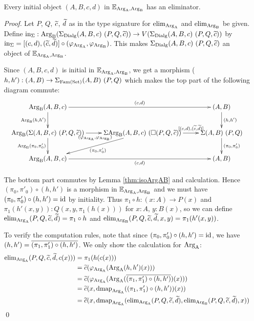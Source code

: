 \documentclass[orivec,envcountsame, ,envcountsect]{llncs}
\begin{document}
\begin{proposition}
\label{thm:init-to-elim}
Every initial object $(A, B, c, d)$ in $\mathbb{E}_{\text{Arg}_{\text{A}}, \text{Arg}_{\text{B}}}$ has an eliminator.
\end{proposition}
\begin{proof}
  Let $P$, $Q$, $\widetilde{c}$, $\widetilde{d}$ as in the type signature for $\text{elim}_{\text{Arg}_{\text{A}}}$
  and $\text{elim}_{\text{Arg}_{\text{B}}}$ be given. Define $\text{in}_{\Sigma} :
  \text{Arg}_{\text{B}}(\Sigma_{\text{Dialg}} (A, B, c)\ (P, Q, \widetilde{c})) \to V(\Sigma_{\text{Dialg}}
  (A, B, c)\ (P, Q, \widetilde{c}))$ by $\text{in}_{\Sigma} = [(c, d), (\widetilde{c},
    \widetilde{d})] \circ (\varphi_{\text{Arg}_{\text{A}}}, \varphi_{\text{Arg}_{\text{B}}})$. This makes
  $\Sigma_{\text{Dialg}} (A, B, c)\ (P, Q, \widetilde{c})$ an object of
  $\mathbb{E}_{\text{Arg}_{\text{A}}, \text{Arg}_{\text{B}}}$.

  Since $(A, B, c, d)$ is initial in $\mathbb{E}_{\text{Arg}_{\text{A}}, \text{Arg}_{\text{B}}}$, we get a morphism ($h, h') :
  (A, B) \to \Sigma_{\text{Fam}(\text{Set})} (A, B)\ (P, Q)$ which makes the top part of the
  following diagram commute:
\[
\resizebox{1\textwidth}{!}{%
\xymatrix{
\ArgB(A, B, c) \ar^-{(c, d)}[rr] \ar_-{\ArgB(h, h')}[d] & & (A, B) \ar^-{(h, h')}[d] \\
\ArgB(\Sigma (A, B, c)\ (P, Q, \stepind{c})) \ar_{(\varphi_{\ArgA}, \varphi_{\ArgB})}[r] \ar_-{\ArgB(\pi_0, \pi'_0)}[d]
 & \Sigma \ArgB(A, B, c)\ (\BOX(P, Q, \stepind{c}))  \ar^-{\sigmamorph{(c,d)}{(\stepind{c},\stepind{d})}}[r] \ar^{(\pi_0, \pi'_0)}[dl]
 & \Sigma (A, B)\ (P, Q) \ar^-{(\pi_0, \pi'_0)}[d]\\
\ArgB(A, B, c) \ar_-{(c, d)}[rr] & & (A, B)
}
}
\]

The bottom part commutes by Lemma \ref{thm:isoArgAB} and
calculation. Hence $(\pi_0, \pi'_0) \circ (h, h')$ is a morphism in
$\mathbb{E}_{\text{Arg}_{\text{A}}, \text{Arg}_{\text{B}}}$ and we must have $(\pi_0, \pi'_0) \circ (h, h')
= \text{id}$ by initiality. Thus $\pi_1 \circ h : (x : A) \to P(x)$ and
$\pi_1(h'(x, y)) : Q(x, y, \pi_1(h(x)))$ for $x : A$, $y : B(x)$, so
we can define $\text{elim}_{\text{Arg}_{\text{A}}}(P, Q, \widetilde{c}, \widetilde{d}) = \pi_1 \circ h$ and
$\text{elim}_{\text{Arg}_{\text{B}}}(P, Q, \widetilde{c}, \widetilde{d}, x, y) = \pi_1(h'(x, y))$. 

To verify the computation rules, note that since $(\pi_0, \pi'_0)
\circ (h, h') = \text{id}$, we have $(h, h') = \overline{(\pi_1, \pi'_1)
  \circ (h, h')}$. We only show the calculation for $\text{Arg}_{\text{A}}$:
\begin{align*}
  \text{elim}_{\text{Arg}_{\text{A}}}(P, Q, \widetilde{c}, \widetilde{d}, c(x)))
 &= \pi_1(h(c(x))) \\
 &= \widetilde{c}(\varphi_{\text{Arg}_{\text{A}}}(\text{Arg}_{\text{A}}(h, h')(x))) \\
 &= \widetilde{c}(\varphi_{\text{Arg}_{\text{A}}}(\text{Arg}_{\text{A}}(\overline{(\pi_1, \pi'_1) \circ (h, h')})(x))) \\
 &= \widetilde{c}(x, \text{dmap}_{\text{Arg}_{\text{A}}}((\pi_1, \pi'_1) \circ (h, h'))(x)) \\
 &= \widetilde{c}(x, \text{dmap}_{\text{Arg}_{\text{A}}}(\text{elim}_{\text{Arg}_{\text{A}}}(P, Q, \widetilde{c}, \widetilde{d}), \text{elim}_{\text{Arg}_{\text{B}}}(P, Q, \widetilde{c}, \widetilde{d}), x))
\end{align*}
\mbox{} \qed %
\end{proof}
\end{document}
